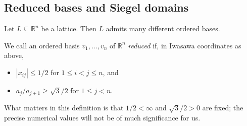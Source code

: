 \documentclass[reqno]{amsart} 
\begin{document}
\subsection{Reduced bases and Siegel domains}
\label{sec:org0d39d27}
Let $L \subseteq \mathbb{R}^n$ be a lattice.  Then ${L}$ admits many different ordered bases.
\begin{definition}
  We call an ordered basis $v_1,\dotsc,v_n$ of $\mathbb{R}^n$ \emph{reduced} if, in Iwasawa coordinates as above,
  \begin{itemize}
  \item $|x_{i j}| \leq 1/2$ for $1 \leq i < j \leq n$, and
  \item $a_{j} / a_{j+1} \geq \sqrt{3}/2$ for $1 \leq j < n$.
  \end{itemize}
\end{definition}
What matters in this definition is that $1/2 < \infty$ and $\sqrt{3}/2 > 0$ are fixed; the precise numerical values will not be of much significance for us.
\end{document}
